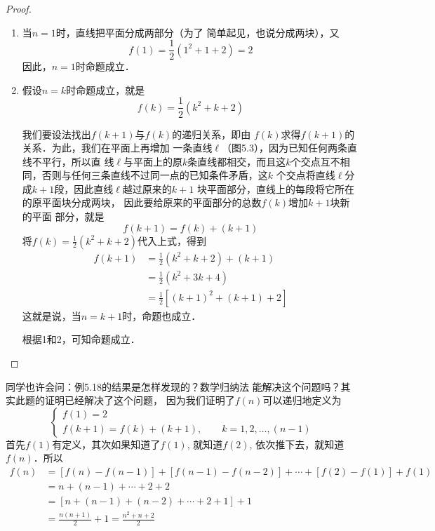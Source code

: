 \begin{proof}
\begin{enumerate}
    \item 当$n=1$时，直线把平面分成两部分（为了
    简单起见，也说分成两块），又
  \[  f(1)=\frac{1}{2}(1^2+1+2)=2\]
    因此，$n=1$时命题成立．
   \item 假设$n=k$时命题成立，就是
\[f(k)=\frac{1}{2}(k^2+k+2)\]

我们要设法找出$f(k+1)$与$f(k)$的递归关系，即由
$f(k)$求得$f(k+1)$的关系．为此，我们在平面上再增加
一条直线$\ell$（图5.3），因为已知任何两条直线不平行，所以直
线$\ell$与平面上的原$k$条直线都相交，而且这$k$个交点互不相
同，否则与任何三条直线不过同一点的已知条件矛盾，这$k$
个交点将直线$\ell$分成$k+1$段，因此直线$\ell$越过原来的$k+1$
块平面部分，直线上的每段将它所在的原平面块分成两块，
因此要给原来的平面部分的总数$f(k)$增加$k+1$块新的平面
部分，就是
\[f(k+1)=f(k)+(k+1)\]
将$f(k)=\frac{1}{2}(k^2+k+2)$代入上式，得到
\[\begin{split}
    f(k+1)&=\frac{1}{2}(k^2+k+2)+(k+1)\\
    &=\frac{1}{2}(k^2+3k+4)\\
    &=\frac{1}{2}[(k+1)^2+(k+1)+2]
\end{split}\]
这就是说，当$n=k+1$时，命题也成立．

\begin{figure}[htp]
    \centering
{}
    \caption{}
\end{figure}


根据1和2，可知命题成立．
\end{enumerate}
\end{proof}

同学也许会问：例5.18的结果是怎样发现的？数学归纳法
能解决这个问题吗？其实此题的证明已经解决了这个问题，
因为我们证明了$f(n)$可以递归地定义为
\[\begin{cases}
    f(1)=2\\
    f(k+1)=f(k)+(k+1),\qquad k=1,2,\ldots,(n-1)
\end{cases}\]
首先$f(1)$有定义，其次如果知道了$f(1)$, 就知道$f(2)$,
依次推下去，就知道$f(n)$．所以
\[\begin{split}
  f(n)&=[f(n)-f(n-1)]+[f(n-1)-f(n-2)]+\cdots +[f(2)-f(1)]+f(1)\\
  &=n+(n-1)+\cdots +2+2\\
  &=[n+(n-1)+(n-2)+\cdots +2+1]+1\\
  &=\frac{n(n+1)}{2}+1=\frac{n^2+n+2}{2}  
\end{split}\]

